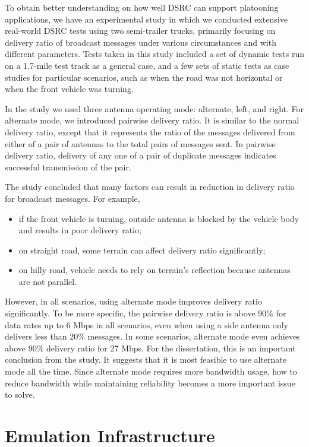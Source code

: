 \documentclass[12pt]{report}
\begin{document}
To obtain better understanding on how well DSRC can support platooning applications, we have an experimental study in which we conducted extensive real-world DSRC tests using two semi-trailer trucks\cite{songDSRC2016}, primarily focusing on delivery ratio of broadcast messages under various circumstances and with different parameters. Tests taken in this study included a set of dynamic tests run on a 1.7-mile test track as a general case, and a few sets of static tests as case studies for particular scenarios, such as when the road was not horizontal or when the front vehicle was turning.

In the study we used three antenna operating mode: alternate, left, and right. For alternate mode, we introduced pairwise delivery ratio. It is similar to the normal delivery ratio, except that it represents the ratio of the messages delivered from either of a pair of antennas to the total pairs of messages sent. In pairwise delivery ratio, delivery of any one of a pair of duplicate messages indicates successful transmission of the pair. 

The study concluded that many factors can result in reduction in delivery ratio for broadcast messages. For example,

\begin{itemize}
  \item if the front vehicle is turning, outside antenna is blocked by the vehicle body and results in poor delivery ratio;
  \item on straight road, some terrain can affect delivery ratio significantly;
  \item on hilly road, vehicle needs to rely on terrain's reflection because antennas are not parallel.
\end{itemize}

However, in all scenarios, using alternate mode improves delivery ratio significantly. To be more specific, the pairwise delivery ratio is above $90\%$ for data rates up to 6 Mbps in all scenarios, even when using a side antenna only delivers less than $20\%$ messages. In some scenarios, alternate mode even achieves above $90\%$ delivery ratio for 27 Mbps. \cite{songDSRC2016} For the dissertation, this is an important conclusion from the study. It suggests that it is most feasible to use alternate mode all the time. Since alternate mode requires more bandwidth usage, how to reduce bandwidth while maintaining reliability becomes a more important issue to solve.

\chapter{Emulation Infrastructure}
\end{document}
